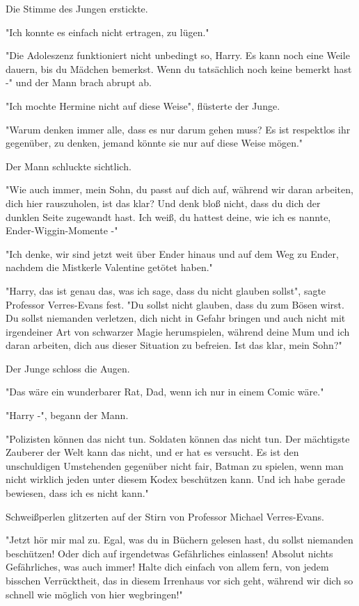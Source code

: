 {Die Stimme des Jungen erstickte.

"Ich konnte es einfach nicht ertragen, zu lügen."

"Die Adoleszenz funktioniert nicht unbedingt so, Harry. Es kann noch eine Weile dauern, bis du Mädchen bemerkst. Wenn du tatsächlich noch keine bemerkt hast -" und der Mann brach abrupt ab.

"Ich mochte Hermine nicht auf diese Weise", flüsterte der Junge.

"Warum denken immer alle, dass es nur darum gehen muss? Es ist respektlos ihr gegenüber, zu denken, jemand könnte sie nur auf diese Weise mögen."

Der Mann schluckte sichtlich.

"Wie auch immer, mein Sohn, du passt auf dich auf, während wir daran arbeiten, dich hier rauszuholen, ist das klar? Und denk bloß nicht, dass du dich der dunklen Seite zugewandt hast. Ich weiß, du hattest deine, wie ich es nannte, Ender-Wiggin-Momente -"

"Ich denke, wir sind jetzt weit über Ender hinaus und auf dem Weg zu Ender, nachdem die Mistkerle Valentine getötet haben."

"Harry, das ist genau das, was ich sage, dass du nicht glauben sollst", sagte Professor Verres-Evans fest. "Du sollst nicht glauben, dass du zum Bösen wirst. Du sollst niemanden verletzen, dich nicht in Gefahr bringen und auch nicht mit irgendeiner Art von schwarzer Magie herumspielen, während deine Mum und ich daran arbeiten, dich aus dieser Situation zu befreien. Ist das klar, mein Sohn?"

Der Junge schloss die Augen.

"Das wäre ein wunderbarer Rat, Dad, wenn ich nur in einem Comic wäre."

"Harry -", begann der Mann.

"Polizisten können das nicht tun. Soldaten können das nicht tun. Der mächtigste Zauberer der Welt kann das nicht, und er hat es versucht. Es ist den unschuldigen Umstehenden gegenüber nicht fair, Batman zu spielen, wenn man nicht wirklich jeden unter diesem Kodex beschützen kann. Und ich habe gerade bewiesen, dass ich es nicht kann."

Schweißperlen glitzerten auf der Stirn von Professor Michael Verres-Evans.

"Jetzt hör mir mal zu. Egal, was du in Büchern gelesen hast, du sollst niemanden beschützen! Oder dich auf irgendetwas Gefährliches einlassen! Absolut nichts Gefährliches, was auch immer! Halte dich einfach von allem fern, von jedem bisschen Verrücktheit, das in diesem Irrenhaus vor sich geht, während wir dich so schnell wie möglich von hier wegbringen!"

}
